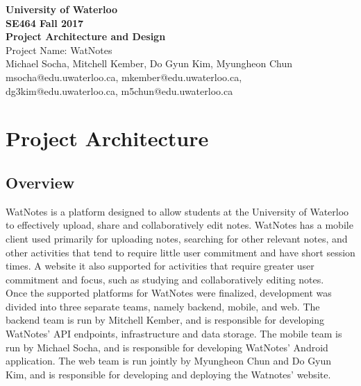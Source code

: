 \documentclass[12pt]{article}
\begin{document}
  \begin{center}
  \vspace*{\fill}
  {\Large\bf University of Waterloo}\\
  \vspace{3mm}
  {\large\bf SE464 Fall 2017}\\
  \vspace{3mm}
  {\Large\bf Project Architecture and Design}\\
  \vspace{5mm}
  {\Large Project Name: WatNotes}\\
  \vspace{5mm}
  Michael Socha, Mitchell Kember, Do Gyun Kim, Myungheon Chun\\
  \vspace{3mm}
  msocha@edu.uwaterloo.ca, mkember@edu.uwaterloo.ca, dg3kim@edu.uwaterloo.ca, m5chun@edu.uwaterloo.ca\\
  \vspace*{\fill}
  \end{center}

  \newpage

  \section{Project Architecture}
  \subsection{Overview}
    WatNotes is a platform designed to allow students at the University of Waterloo to effectively upload, share
    and collaboratively edit notes. WatNotes has a mobile client used primarily for uploading notes, searching for
    other relevant notes, and other activities that tend to require little user commitment and have short session times.
    A website it also supported for activities that require greater user commitment and focus, such as studying and
    collaboratively editing notes. \\

    Once the supported platforms for WatNotes were finalized, development was divided into three separate teams, namely
    backend, mobile, and web. The backend team is run by Mitchell Kember, and is responsible for developing WatNotes' API
    endpoints, infrastructure and data storage. The mobile team is run by Michael Socha, and is responsible for developing
    WatNotes' Android application. The web team is run jointly by Myungheon Chun and Do Gyun Kim, and is responsible for
    developing and deploying the Watnotes' website. \\
\end{document}
